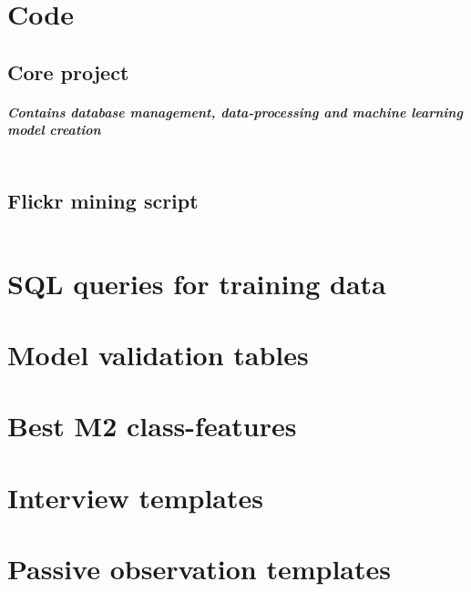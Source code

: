 \appendix

\chapter{Code} \label{python_code}

\section{Core project}
\paragraph*{Contains database management, data-processing and machine learning model creation}

\inputminted[linenos, fontsize=\tiny]{python}{code/fusion_file_appendix.py}

\section{Flickr mining script}

\inputminted[linenos, fontsize=\tiny]{python}{code/flickr_mining_Kt_Zug_Appendix.py}


\chapter{SQL queries for training data} \label{sql_queries_for_trainingdata}


\chapter{Model validation tables} \label{model_validation_tables}

\chapter{Best M2 class-features} \label{M2_top_features}

\chapter{Interview templates} \label{interview_templates}

\chapter{Passive observation templates} \label{passive_obs_templates}

